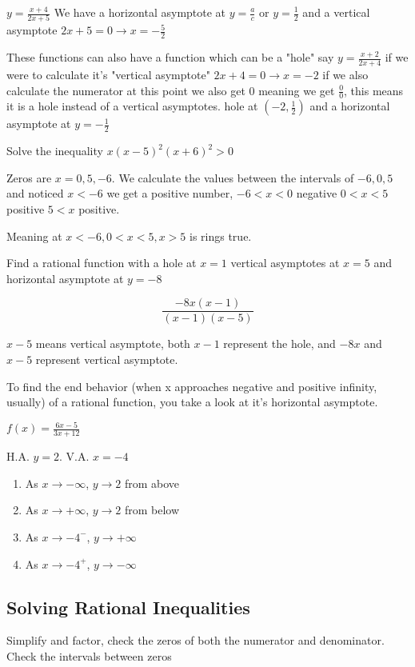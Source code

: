 \documentclass[../main.tex]{subfiles}
\begin{document}
$y=\frac{x+4}{2x+5}$ We have a horizontal asymptote at $y=\frac{a}{c}$ or $y=\frac{1}{2}$ and a vertical asymptote $2x+5=0 \rightarrow x=-\frac{5}{2}$ 

These functions can also have a function which can be a "hole" say $y=\frac{x+2}{2x+4}$ if we were to calculate it's "vertical asymptote" $2x+4=0\rightarrow x=-2$ if we also calculate the numerator at this point we also get $0$ meaning we get $\frac{0}{0}$, this means it is a hole instead of a vertical asymptotes. hole at $(-2,\frac{1}{2})$ and a horizontal asymptote at $y=-\frac{1}{2}$

Solve the inequality $x(x-5)^2(x+6)^2>0$ 

Zeros are $x=0,5,-6$. We calculate the values between the intervals of $-6,0,5$ and noticed $x<-6$ we get a positive number, $-6<x<0$ negative $0<x<5$ positive $5<x$ positive.

Meaning at $x<-6,0<x<5,x>5$ is rings true.

\noindent Find a rational function with a hole at $x=1$ vertical asymptotes at $x=5$ and horizontal asymptote at $y=-8$

$$\frac{-8x(x-1)}{(x-1)(x-5)}$$

$x-5$ means vertical asymptote, both $x-1$ represent the hole, and $-8x$ and $x-5$ represent vertical asymptote.

To find the end behavior (when x approaches negative and positive infinity, usually) of a rational function, you take a look at it's horizontal asymptote. 

$f(x)=\frac{6x-5}{3x+12}$

H.A. $y=2$. V.A. $x=-4$

\begin{enumerate}
    \item As $x\rightarrow -\infty$, $y\rightarrow2$ from above
    \item As $x\rightarrow +\infty$, $y\rightarrow2$ from below
    \item As $x\rightarrow-4^-$, $y\rightarrow+\infty$
    \item As $x\rightarrow-4^+$, $y\rightarrow-\infty$
\end{enumerate}

\subsection{Solving Rational Inequalities}

Simplify and factor, check the zeros of both the numerator and denominator. Check the intervals between zeros 
\end{document}
